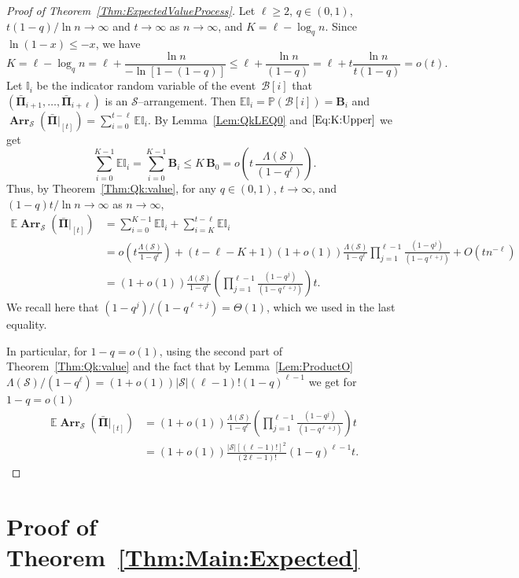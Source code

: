 \documentclass[letterpaper,11pt]{article}
\theoremstyle{definition}
\theoremstyle{remark}
\renewcommand{\le}{\leqslant}
\renewcommand{\ge}{\geqslant}
\newcommand{\bE}{\mathbb{E}}
\newcommand{\productO}{\Lambda(\cS)}
\newcommand{\Arr}{\ensuremath{\operatorname{\mathbf{Arr}}}}
\newcommand{\Pra}[1]{\mathbb{P}\left(#1\right)}
\newcommand{\bB}{\mathbf{B}}
\newcommand{\cB}{\mathcal{B}}
\newcommand{\Ind}{\mathbb{I}}
\newcommand{\barPi}{\bar {\mathbf \Pi}}
\newcommand{\cS}{\mathcal{S}}
\begin{document}
\begin{proof}[Proof of Theorem~\ref{Thm:ExpectedValueProcess}] 
	
	
	
	Let  $\ell\ge 2$, $q\in (0,1)$, $t(1-q)/\ln n\to \infty$ and $t\to\infty$ as $n\to\infty$, and $K=\ell-\log_q n$. Since $\ln(1-x)\le -x$, 
	we have
	\begin{equation}\label{Eq:K:Upper}
		K=\ell-\log_q n=\ell+\frac{\ln n}{-\ln [1-(1-q)]} \le \ell+\frac{\ln n}{(1-q)} = \ell+t \frac{\ln n}{t(1-q)}=o(t).
	\end{equation}
	Let $\Ind_i$ be the indicator random variable of the event~$\cB[i]$ that $(\barPi_{i+1},\ldots,\barPi_{i+\ell})$ is an $\cS$--arrangement. Then $\bE \Ind_i = \Pra{\cB[i]}=\bB_i$ and $\Arr_{\cS}(\barPi|_{[t]})=\sum_{i=0}^{t-\ell}\bE \Ind_i$. 
	By Lemma~\ref{Lem:QkLEQ0} and $\eqref{Eq:K:Upper}$ we get 
	\[
	\sum_{i=0}^{K-1}\bE \Ind_i = \sum_{i=0}^{K-1}\bB_{i}\le K\,  \bB_{0} = o\left(t\, \frac{\productO}{(1-q^\ell)}\right).
	\]
	Thus, by Theorem~\ref{Thm:Qk:value}, for any $q\in (0,1)$, $t\to\infty$, and $(1-q)t/\ln n\to \infty$  as $n\to \infty$,
	\[
	\begin{split}
		\bE \Arr_\cS(\barPi|_{[t]}) 
		&=\sum_{i=0}^{K-1}\bE\Ind_i + \sum_{i=K}^{t-\ell}\bE\Ind_i\\
		&=o\left(t\frac{\productO}{1-q^\ell}\right)+(t-\ell-K+1)(1+o(1))\frac{\productO}{1-q^{\ell}}\prod_{j=1}^{\ell-1}\frac{(1-q^j)}{(1-q^{\ell+j})}+O(tn^{-\ell})\\
		&=(1+o(1))\frac{\productO}{1-q^{\ell}}\left(\prod_{j=1}^{\ell-1}\frac{(1-q^j)}{(1-q^{\ell+j})}\right)t.
	\end{split}
	\]	
	We recall here that $(1-q^j)/(1-q^{\ell+j})=\Theta(1)$, which we used in the last equality.
	
	In particular, for $1-q=o(1)$, using the second part of Theorem~\ref{Thm:Qk:value} and the fact that by Lemma~\ref{Lem:ProductO} $\productO/(1-q^{\ell})=(1+o(1)) |\cS|(\ell-1)!(1-q)^{\ell-1}$ we get for $1-q=o(1)$
	\[
	\begin{split}
		\bE \Arr_\cS(\barPi|_{[t]}) 
		&=(1+o(1))\frac{\productO}{1-q^{\ell}}\left(\prod_{j=1}^{\ell-1}\frac{(1-q^j)}{(1-q^{\ell+j})}\right)t\\
		&=(1+o(1))\frac{|\cS|[(\ell-1)!]^2}{(2\ell-1)!}(1-q)^{\ell-1}t.
	\end{split}
	\]	
\end{proof}





\section{Proof of Theorem~\ref{Thm:Main:Expected} }
\end{document}
